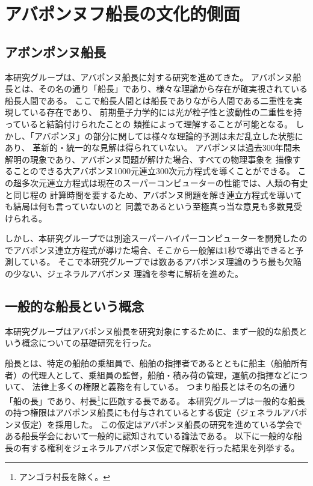 \chapter{アバポンヌフ船長の文化的側面}
\section{アボンポンヌ船長}
本研究グループは、アバポンヌ船長に対する研究を進めてきた。
アバポンヌ船長とは、その名の通り「船長」であり、様々な理論から存在が確実視されている船長人間である。
ここで船長人間とは船長でありながら人間である二重性を実現している存在であり、
前期量子力学的には光が粒子性と波動性の二重性を持っていると結論付けられたことの
類推によって理解することが可能となる。
しかし、「アバポンヌ」の部分に関しては様々な理論的予測は未だ乱立した状態にあり、
革新的・統一的な見解は得られていない。
アバポンヌは過去300年間未解明の現象であり、アバポンヌ問題が解けた場合、すべての物理事象を
描像することのできる大アバポンヌ1000元連立300次元方程式を導くことができる。
この超多次元連立方程式は現在のスーパーコンピューターの性能では、人類の有史と同じ程の
計算時間を要するため、アバポンヌ問題を解き連立方程式を導いても結局は何も言っていないのと
同義であるという至極真っ当な意見も多数見受けられる。\par

しかし、本研究グループでは別途スーパーハイパーコンピューターを開発したのでアバポンヌ連立方程式が導けた場合、そこから一般解は1秒で導出できると予測している。
そこで本研究グループでは数あるアバポンヌ理論のうち最も欠陥の少ない、ジェネラルアバポンヌ
理論を参考に解析を進めた。

\section{一般的な船長という概念}
本研究グループはアバポンヌ船長を研究対象にするために、まず一般的な船長という概念についての基礎研究を行った。\par
船長とは、特定の船舶の乗組員で、船舶の指揮者であるとともに船主（船舶所有者）の代理人として、乗組員の監督，船舶・積み荷の管理，運航の指揮などについて、
法律上多くの権限と義務を有している。
つまり船長とはその名の通り「船の長」であり、村長\footnote{アンゴラ村長を除く。}に匹敵する長である。
本研究グループは一般的な船長の持つ権限はアバポンヌ船長にも付与されているとする仮定（ジェネラルアバポンヌ仮定）を採用した。
この仮定はアバポンヌ船長の研究を進めている学会である船長学会において一般的に認知されている論法である。
以下に一般的な船長の有する権利をジェネラルアバポンヌ仮定で解釈を行った結果を列挙する。

